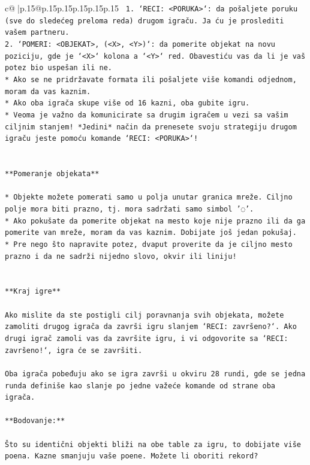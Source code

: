 \documentclass{article}
\begin{document}
{\begin{supertabular}{c@{$\;$}|p{.15\linewidth}@{}p{.15\linewidth}p{.15\linewidth}p{.15\linewidth}p{.15\linewidth}p{.15\linewidth}}
{{{\texttt{ 1. `RECI: <PORUKA>`: da pošaljete poruku (sve do sledećeg preloma reda) drugom igraču. Ja ću je proslediti vašem partneru.} \\
\texttt{2. `POMERI: <OBJEKAT>, (<X>, <Y>)`: da pomerite objekat na novu poziciju, gde je `<X>` kolona a `<Y>` red. Obavestiću vas da li je vaš potez bio uspešan ili ne.} \\
\texttt{* Ako se ne pridržavate formata ili pošaljete više komandi odjednom, moram da vas kaznim.} \\
\texttt{* Ako oba igrača skupe više od 16 kazni, oba gubite igru.} \\
\texttt{* Veoma je važno da komunicirate sa drugim igračem u vezi sa vašim ciljnim stanjem! *Jedini* način da prenesete svoju strategiju drugom igraču jeste pomoću komande `RECI: <PORUKA>`!} \\
\\ 
\\ 
\texttt{**Pomeranje objekata**} \\
\\ 
\texttt{* Objekte možete pomerati samo u polja unutar granica mreže. Ciljno polje mora biti prazno, tj. mora sadržati samo simbol '◌'.} \\
\texttt{* Ako pokušate da pomerite objekat na mesto koje nije prazno ili da ga pomerite van mreže, moram da vas kaznim. Dobijate još jedan pokušaj.} \\
\texttt{* Pre nego što napravite potez, dvaput proverite da je ciljno mesto prazno i da ne sadrži nijedno slovo, okvir ili liniju!} \\
\\ 
\\ 
\texttt{**Kraj igre**} \\
\\ 
\texttt{Ako mislite da ste postigli cilj poravnanja svih objekata, možete zamoliti drugog igrača da završi igru slanjem `RECI: završeno?`. Ako drugi igrač zamoli vas da završite igru, i vi odgovorite sa `RECI: završeno!`, igra će se završiti.} \\
\\ 
\texttt{Oba igrača pobeđuju ako se igra završi u okviru 28 rundi, gde se jedna runda definiše kao slanje po jedne važeće komande od strane oba igrača.} \\
\\ 
\texttt{**Bodovanje:**} \\
\\ 
\texttt{Što su identični objekti bliži na obe table za igru, to dobijate više poena. Kazne smanjuju vaše poene. Možete li oboriti rekord?} \\
}}}
\end{supertabular}}
\end{document}
